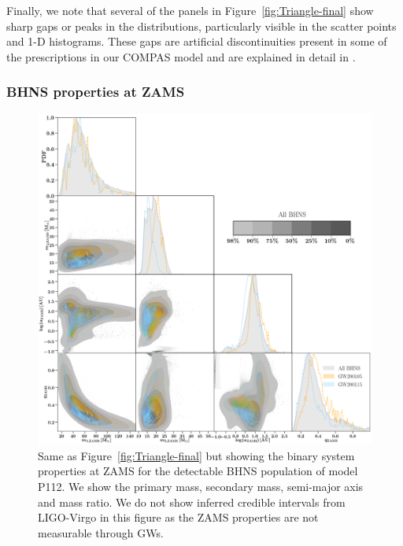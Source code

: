 \documentclass{aastex63}
\newcommand{\model}{P112\xspace}
\begin{document}
Finally, we note that several of the panels in Figure~\ref{fig:Triangle-final} show sharp gaps or peaks in the distributions, particularly visible in the scatter points and 1-D histograms. These gaps are artificial discontinuities present in some of the prescriptions in our COMPAS model and are explained in detail in \citet[][and references therein]{Broekgaarden:2021}.



\subsubsection{BHNS properties at ZAMS }
\label{results:BHNS-properties-at-ZAMS}

\begin{figure}
    \centering
    \includegraphics[width=1.0\textwidth]{figures/Scatter_ZAMS_3_112_P.png}
    \caption{Same as Figure~\ref{fig:Triangle-final} but showing the  binary system properties at \ac{ZAMS} for the detectable \ac{BHNS} population of model \model. We show the primary mass, secondary mass, semi-major axis and mass ratio. We do not show inferred credible intervals from LIGO-Virgo in this figure as the ZAMS properties are not measurable through \acp{GW}. 
    }
    \label{fig:Triangle-ZAMS}
\end{figure}
\end{document}
